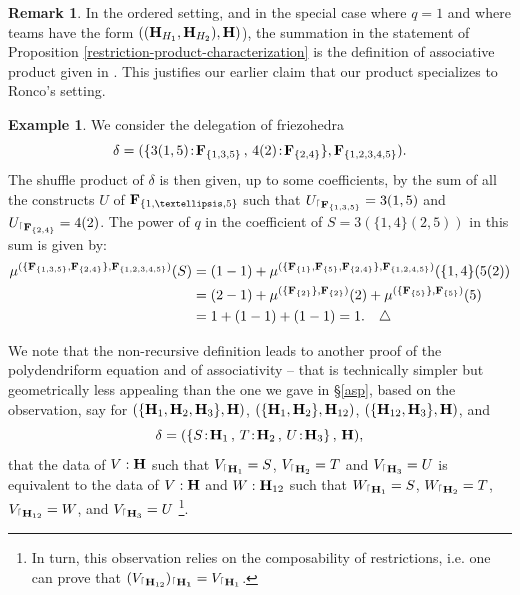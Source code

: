 \documentclass[11pt]{article}
\theoremstyle{definition}
\newtheorem{remark}[theo]{Remark}
\newtheorem{example}[theo]{Example}
\numberwithin{equation}{section}
\numberwithin{equation}{section}
\newcommand\xqed[1]{%
  \leavevmode\unskip\penalty9999 \hbox{}\nobreak\hfill
  \quad\hbox{#1}}
\newcommand\demo{\xqed{$\triangle$}}
\newcommand{\hyper}[1]{{\bf #1}}
\newcommand{\restrconstr}[2]{{#1}_{{}^\lceil {#2}}}
\begin{document}
\begin{remark}\label{Ronco-specialize} 
In the ordered setting, and in the special case  where $q=1$  and where teams have the form $((\hyper{H}_{H_1},\hyper{H}_{H_2}),\hyper{H})$), the summation in the statement of Proposition \ref{restriction-product-characterization}
 is  the definition of associative product given in  \cite[Theorem 3.19]{RoncoGTO}. This justifies our  earlier claim that our product specializes to Ronco's setting.
\end{remark}
\begin{example}
We consider the delegation of friezohedra $$\delta=(\{3(1,5)\!:\!\hyper{F}_{\{1,3,5\}}\,,\, 4(2)\!:\!\hyper{F}_{\{2,4\}}\},\hyper{F}_{\{1,2,3,4,5\}}).$$ The   shuffle product of $\delta$ is then given, up to some coefficients, by the sum of all the constructs $U$ of $\hyper{F}_{\{1,\ldots,5\}}$ such that  
$\restrconstr{U}{\hyper{F}_{\{1,3,5\}}} = 3(1,5)$ and $\restrconstr{U}{\hyper{F}_{\{2,4\}}} = 4(2)$. The power of $q$ in the coefficient of $S=3(\{1,4\}(2,5))$ in this sum is given by:
\begin{align*}
\mu^{(\{\hyper{F}_{\{1,3,5\}}, \hyper{F}_{\{2,4\}}\},\hyper{F}_{\{1,2,3,4,5\}})}(S)&= (1-1)+ \mu^{(\{\hyper{F}_{\{1\}}, \hyper{F}_{\{5\}}, \hyper{F}_{\{2,4\}}\},\hyper{F}_{\{1,2,4,5\}})}(\{1,4\}(5(2)) \\
   &= (2-1)+ \mu^{(\{\hyper{F}_{\{2\}}\},\hyper{F}_{\{2\}})}(2) +\mu^{(\{\hyper{F}_{\{5\}}\},\hyper{F}_{\{5\}})}(5)  \\
  &= 1+ (1-1) + (1-1)=1.  \demo
\end{align*} 

\end{example}

We note that the non-recursive definition leads to another proof of the polydendriform equation and of associativity -- that is technically  simpler but geometrically less appealing than the one we gave in \S\ref{asp}, based on the observation, say for $(\{{\bf H}_1,{\bf H}_2,{\bf H}_3\},{\bf H})$, $(\{{\bf H}_1,{\bf H}_2\},{\bf H}_{12})$,  $(\{{\bf H}_{12},{\bf H}_3\},{\bf H})$, and $$\delta=(\{S\!:\!{\bf H}_1\,,\, T\!:\!{\bf H}_2\,,\,U\!:\!{\bf H}_3\}\,,\,{\bf H}),$$
 that the data of $V:\hyper{H}$ such that $\restrconstr{V}{\hyper{H}_1}=S$, $\restrconstr{V}{\hyper{H}_2}=T$ and 
 $\restrconstr{V}{\hyper{H}_3}=U$ is equivalent to the data of $V:\hyper{H}$ and $W:\hyper{H}_{12}$ such that $\restrconstr{W}{\hyper{H}_1}=S$, $\restrconstr{W}{\hyper{H}_2}=T$, $\restrconstr{V}{\hyper{H}_{12}}=W$, and $\restrconstr{V}{\hyper{H}_3}=U$ \footnote{In turn, this observation relies on the composability of restrictions, i.e. one can prove that 
$(\restrconstr{V}{\hyper{H}_{12}})\restrconstr{{}}{\hyper{H_1}}= \restrconstr{V}{\hyper{H}_1}$.}.
 
\end{document}
